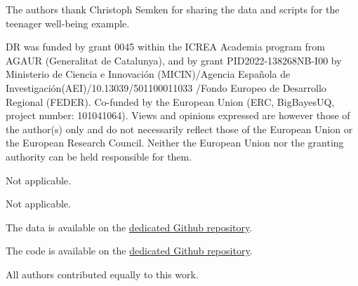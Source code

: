 \documentclass[pdflatex,sn-mathphys-num]{sn-jnl}%
\theoremstyle{thmstyleone}%
\theoremstyle{thmstyletwo}%
\theoremstyle{thmstylethree}%
\begin{document}
The authors thank Christoph Semken for sharing the data and scripts for the teenager well-being example.



DR was funded by grant 0045 within the ICREA Academia program from AGAUR (Generalitat de Catalunya), and by grant PID2022-138268NB-I00 by Ministerio de Ciencia e Innovaci\'on (MICIN)/Agencia Espa\~{n}ola de Investigaci\'on(AEI)/10.13039/501100011033 /Fondo Europeo de Desarrollo Regional (FEDER). Co-funded by the European Union (ERC, BigBayesUQ, project number: 101041064). Views and opinions expressed are however those of the author(s) only and do not necessarily reflect those of the European Union or the European Research Council. Neither the European Union nor the granting authority can be held responsible for them.


Not applicable.


Not applicable.


The data is available on the \href{https://github.com/paulrognonvael/multiverse.evalues}{dedicated Github repository}.


The code is available on the \href{https://github.com/paulrognonvael/multiverse.evalues}{dedicated Github repository}.


All authors contributed equally to this work.







\end{document}
